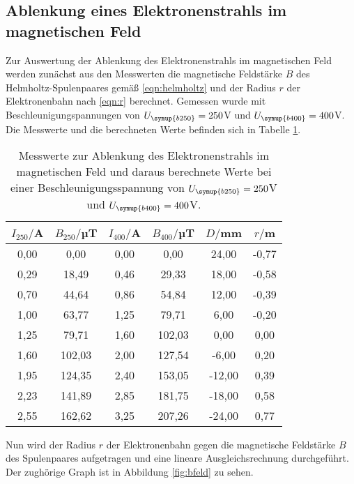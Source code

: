 \subsection{Ablenkung eines Elektronenstrahls im magnetischen Feld}
\label{subsec:bfeld}

Zur Auswertung der Ablenkung des Elektronenstrahls im magnetischen Feld werden
zunächst aus den Messwerten die magnetische Feldstärke $B$ des Helmholtz-Spulenpaares
gemäß \eqref{eqn:helmholtz} und der Radius $r$ der Elektronenbahn nach \eqref{eqn:r} berechnet.
Gemessen wurde mit Beschleunigungspannungen von $U_{\symup{b250}}=250$V und
$U_{\symup{b400}}=400$V. Die Messwerte und
die berechneten Werte befinden sich in Tabelle \ref{tab:magnetisch}.

\begin{table}[htp]
	\begin{center}
    \caption{Messwerte zur Ablenkung des Elektronenstrahls im magnetischen Feld und
    daraus berechnete Werte bei einer Beschleunigungsspannung von
    $U_{\symup{b250}}=250$V und $U_{\symup{b400}}=400$V.}
    \label{tab:magnetisch}
		\begin{tabular}{cccccc}
		\toprule
			{$I_{250}/$A} & {$B_{250}/$µT} & {$I_{400}/$A} & {$B_{400}/$µT} & {$D/$mm} & {$r/$m}\\
			\midrule
			0,00 & 0,00  & 0,00 &  0,00 & 24,00 & -0,77\\
			0,29 & 18,49 & 0,46 & 29,33 & 18,00 & -0,58\\
			0,70 & 44,64 & 0,86 & 54,84 & 12,00 & -0,39\\
			1,00 & 63,77 & 1,25 & 79,71 & 6,00 & -0,20\\
			1,25 & 79,71 & 1,60 & 102,03 & 0,00 & 0,00\\
			1,60 & 102,03 & 2,00 & 127,54 & -6,00 & 0,20\\
			1,95 & 124,35 & 2,40 & 153,05 & -12,00 & 0,39\\
			2,23 & 141,89 & 2,85 & 181,75 & -18,00 & 0,58\\
			2,55 & 162,62 & 3,25 & 207,26 & -24,00 & 0,77\\
		\bottomrule
		\end{tabular}
	\end{center}
\end{table}

Nun wird der Radius $r$ der Elektronenbahn gegen die magnetische Feldstärke $B$
des Spulenpaares aufgetragen und eine lineare Ausgleichsrechnung durchgeführt.
Der zughörige Graph ist in Abbildung \ref{fig:bfeld} zu sehen.

